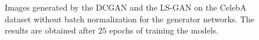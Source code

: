 \begin{figure}[t]
\centering
{}%
   \caption{Images generated by the DCGAN and the LS-GAN on the CelebA dataset without batch normalization for the generator networks. The results are obtained after $25$ epochs of training the models.}\label{fig:celebA_noBN}
\end{figure}





